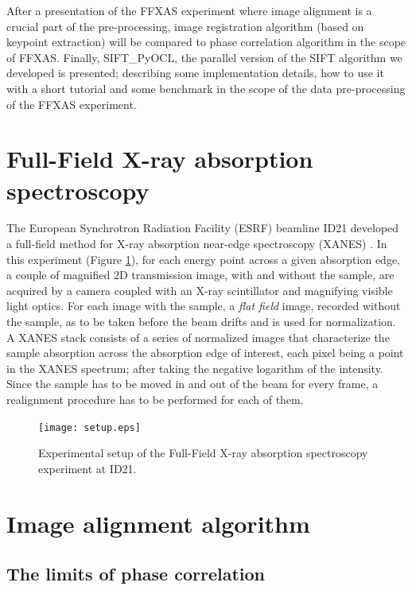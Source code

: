 \documentclass[preprint]{iucr}
\begin{document}
After a presentation of the FFXAS experiment where image alignment is a crucial
part of the pre-processing, image registration algorithm (based on keypoint
extraction) will be compared to phase correlation algorithm in the
scope of FFXAS.
Finally, SIFT\_PyOCL, the parallel version of the SIFT algorithm  we developed
is presented; describing some implementation details, how to use it with a short
tutorial and some benchmark in the scope of the data pre-processing of the
FFXAS experiment.


\section{Full-Field X-ray absorption spectroscopy}
The European Synchrotron Radiation Facility (ESRF) beamline ID21 developed a
full-field method for X-ray absorption near-edge spectroscopy
(XANES) \cite{andrade,fullfield}.
In this experiment (Figure \ref{setup}), for each energy point across a given
absorption edge, a couple of magnified 2D transmission image, with and
without the sample, are acquired by a camera coupled with an
X-ray scintillator and magnifying visible light optics.
For each image with the sample, a \emph{flat field} image, recorded
without the sample, as to be taken before the beam drifts and is used for
normalization.
A XANES stack consists of a series of normalized images that characterize the
sample absorption across the absorption edge of interest, each pixel being a
point in the XANES spectrum; after taking the negative logarithm of the
intensity.
Since the sample has to be moved in and out of the beam for every frame, a
realignment procedure has to be performed for each of them.

\begin{figure}
\begin{center}
\texttt{[image: setup.eps]}
\caption{\label{setup} Experimental setup of the Full-Field X-ray absorption
spectroscopy experiment at ID21.}
\end{center}
\end{figure}

\section{Image alignment algorithm}

\subsection{The limits of phase correlation}
\end{document}
